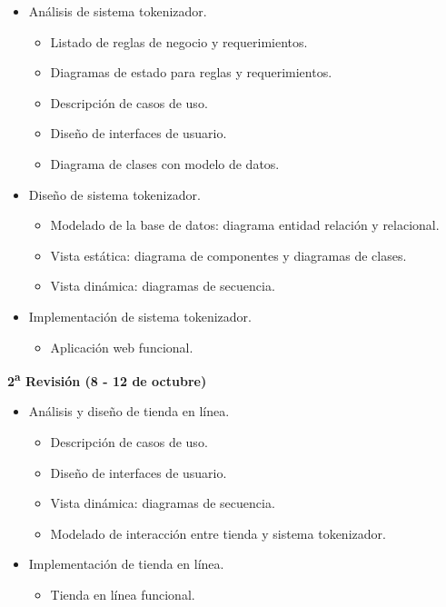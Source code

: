 \documentclass[10pt, letterpaper]{article}
\begin{document}
  \begin{itemize}

    \item Análisis de sistema tokenizador.

      \begin{itemize}
        \item Listado de reglas de negocio y requerimientos.
        \item Diagramas de estado para reglas y requerimientos.
        \item Descripción de casos de uso.
        \item Diseño de interfaces de usuario.
        \item Diagrama de clases con modelo de datos.
      \end{itemize}

    \item Diseño de sistema tokenizador.

      \begin{itemize}
        \item Modelado de la base de datos:
          diagrama entidad relación y relacional.
        \item Vista estática: diagrama de componentes y diagramas de clases.
        \item Vista dinámica: diagramas de secuencia.
      \end{itemize}

    \item Implementación de sistema tokenizador.

      \begin{itemize}
        \item Aplicación web funcional.
      \end{itemize}

  \end{itemize}

  \noindent
  \textbf{2\textsuperscript{a} Revisión (8 - 12 de octubre)}

  \begin{itemize}

    \item Análisis y diseño de tienda en línea.

      \begin{itemize}
        \item Descripción de casos de uso.
        \item Diseño de interfaces de usuario.
        \item Vista dinámica: diagramas de secuencia.
        \item Modelado de interacción entre tienda y sistema tokenizador.
      \end{itemize}

    \item Implementación de tienda en línea.

      \begin{itemize}
        \item Tienda en línea funcional.
      \end{itemize}

  \end{itemize}
\end{document}
